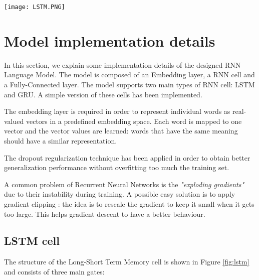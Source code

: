 
\begin{figure*}[t]
\centerline{\texttt{[image: LSTM.PNG]}}
\caption{Long-Short Term Memory cell structure and related equations \cite{LSTM_GRU_structure}.}
\label{fig:lstm}
\end{figure*}

\section{Model implementation details}

In this section, we explain some implementation details of the designed 
RNN Language Model. The model is composed of an Embedding layer, a RNN cell 
and a Fully-Connected layer. The model supports two main types of RNN cell: 
LSTM and GRU. A simple version of these cells has been implemented.

The embedding layer is required in order to represent individual words as
real-valued vectors in a predefined embedding space. Each word is mapped 
to one vector and the vector values are learned: words that have 
the same meaning should have a similar representation.

The dropout regularization technique \cite{dropout} has been applied in order
to obtain better generalization performance without overfitting too much the
training set.

A common problem of Recurrent Neural Networks is the \textit{"exploding gradients"} 
due to their instability during training.
A possible easy solution is to apply gradient clipping \cite{clip}: the idea is to
rescale the gradient to keep it small when it gets too large.
This helps gradient descent to have a better behaviour.

\subsection{LSTM cell}


The structure of the Long-Short Term Memory cell is shown in Figure \ref{fig:lstm}
and consists of three main gates:

